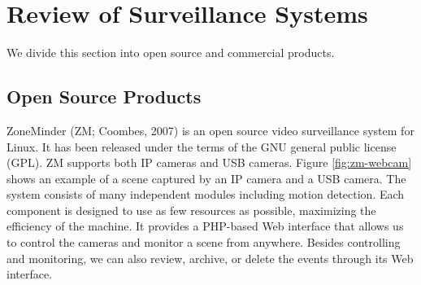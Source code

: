 \section{Review of \DIFdelbegin {}\DIFdelend \DIFaddbegin {}\DIFaddend Surveillance Systems}

We divide this section into \DIFaddbegin {}\DIFaddend open source and commercial products. \DIFaddbegin {}\DIFaddend 

\subsection{Open Source \DIFaddbegin {}\DIFaddend Products}

ZoneMinder (ZM; Coombes, 2007)\nocite{zoneminder} is an open source
video surveillance system for Linux. It has been released under the
terms of the GNU general public license (GPL). ZM supports both IP
cameras and USB cameras. Figure \ref{fig:zm-webcam} shows an example
of a scene captured by an IP camera and a USB camera. The system
consists of many independent modules including motion detection.  Each
component is designed to use as few resources as possible, maximizing
the efficiency of the machine. It provides a PHP-based Web interface
that allows us to control the cameras and monitor a scene from
anywhere. Besides controlling and monitoring, we can also review,
archive, or delete the events through its Web interface.

